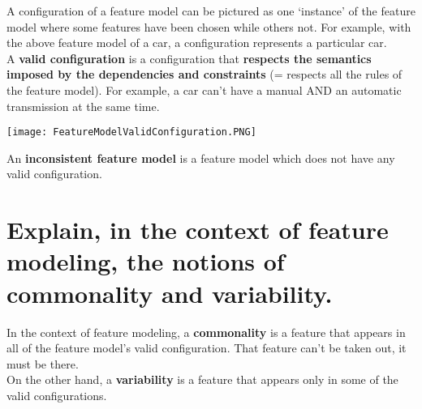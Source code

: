 A configuration of a feature model can be pictured as one ‘instance’ of the feature model where some features have been chosen while others not. For example, with the above feature model of a car, a configuration represents a particular car.\\

A \textbf{valid configuration} is a configuration that \textbf{respects the semantics imposed by the dependencies and constraints} (= respects all the rules of the feature model). For example, a car can’t have a manual AND an automatic transmission at the same time.\\
\begin{center}
\texttt{[image: FeatureModelValidConfiguration.PNG]}
\end{center}
An \textbf{inconsistent feature model} is a feature model which does not have any valid configuration.


\section{Explain, in the context of feature modeling, the notions of commonality and variability.}

In the context of feature modeling, a \textbf{commonality} is a feature that appears in all of the feature model’s valid configuration. That feature can’t be taken out, it must be there. \\
On the other hand, a \textbf{variability} is a feature that appears only in some of the valid configurations. 
